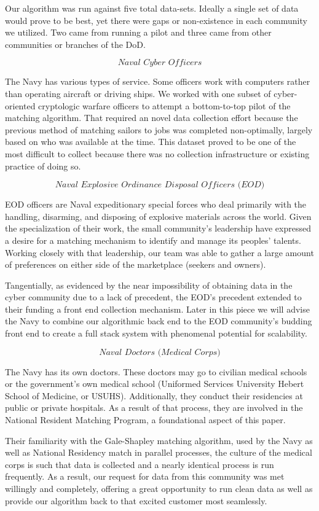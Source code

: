 Our algorithm was run against five total data-sets. Ideally a single set of data would prove to be best, yet there were gaps or non-existence in each community we utilized. Two came from running a pilot and three came from other communities or branches of the DoD. 

\[\textit{Naval Cyber Officers}\]

The Navy has various types of service.  Some officers work with computers rather than operating aircraft or driving ships. We worked with one subset of cyber-oriented cryptologic warfare officers to attempt a bottom-to-top pilot of the matching algorithm.  That required an novel data collection effort because the previous method of matching sailors to jobs was completed non-optimally, largely based on who was available at the time. This dataset proved to be one of the most difficult to collect because there was no collection infrastructure or existing practice of doing so. 

\[\textit{Naval Explosive Ordinance Disposal Officers (EOD)}\]

EOD officers are Naval expeditionary special forces who deal primarily with the handling, disarming, and disposing of explosive materials across the world. Given the specialization of their work, the small community’s leadership have expressed a desire for a matching mechanism to identify and manage its peoples’ talents.  Working closely with that leadership, our team was able to gather a large amount of preferences on either side of the marketplace (seekers and owners).  

Tangentially, as evidenced by the near impossibility of obtaining data in the cyber community due to a lack of precedent, the EOD’s precedent extended to their funding a front end collection mechanism.  Later in this piece we will advise the Navy to combine our algorithmic back end to the EOD community’s budding front end to create a full stack system with phenomenal potential for scalability.  

\[\textit{Naval Doctors (Medical Corps)}\]

The Navy has its own doctors. These doctors may go to civilian medical schools or the government’s own medical school (Uniformed Services University Hebert School of Medicine, or USUHS).  Additionally, they conduct their residencies at public or private hospitals.  As a result of that process, they are involved in the National Resident Matching Program, a foundational aspect of this paper. 

Their familiarity with the Gale-Shapley matching algorithm, used by the Navy as well as National Residency match in parallel processes, the culture of the medical corps is such that data is collected and a nearly identical process is run frequently.  As a result, our request for data from this community was met willingly and completely, offering a great opportunity to run clean data as well as provide our algorithm back to that excited customer most seamlessly. 


